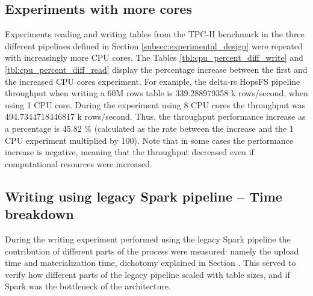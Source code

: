 \subsection{Experiments with more  cores}

Experiments reading and writing tables from the TPC-H benchmark in the three different pipelines defined in Section \ref{subsec:experimental_design} were repeated with increasingly more \gls{CPU} cores. The Tables \ref{tbl:cpu_percent_diff_write} and \ref{tbl:cpu_percent_diff_read} display the percentage increase between the first and the increased \gls{CPU} cores experiment. For example, the delta-rs \gls{HopsFS} pipeline throughput when writing a 60M rows table is 339.288979358 k rows/second, when using 1 \gls{CPU} core. During the experiment using 8 \gls{CPU} cores the throughput was 494.7344718446817 k rows/second. Thus, the throughput performance increase as a percentage is 45.82 \% (calculated as the rate between the increase and the 1 \gls{CPU} experiment multiplied by 100). Note that in some cases the performance increase is negative, meaning that the throughput decreased even if computational resources were increased.

\subsection{Writing using legacy Spark pipeline -- Time breakdown}

During the writing experiment performed using the legacy Spark pipeline the contribution of different parts of the process were measured: namely the upload time and materialization time, dichotomy explained in Section . This served to verify how different parts of the legacy pipeline scaled with table sizes, and if Spark was the bottleneck of the architecture.

